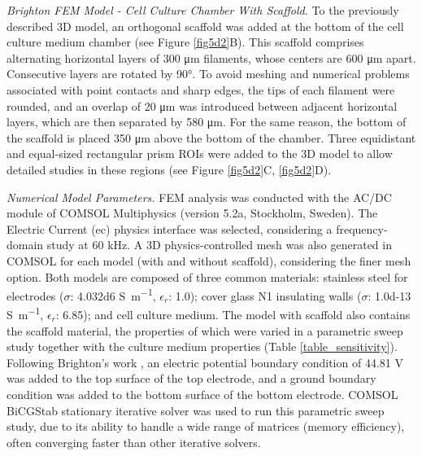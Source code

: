 \noindent \textit{Brighton \acs{FEM} Model - Cell Culture Chamber With Scaffold.} To the previously described \acs{3D} model, an orthogonal scaffold was added at the bottom of the cell culture medium chamber (see Figure \ref{fig5d2}B). This scaffold comprises alternating horizontal layers of 300 \si{\micro\meter} filaments, whose centers are 600 \si{\micro\meter} apart. Consecutive layers are rotated by 90\si{\degree}. To avoid meshing and numerical problems associated with point contacts and sharp edges, the tips of each filament were rounded, and an overlap of 20 \si{\micro\meter} was introduced between adjacent horizontal layers, which are then separated by 580 \si{\micro\meter}. For the same reason, the bottom of the scaffold is placed 350 \si{\micro\meter}  above the bottom of the chamber. Three equidistant and equal-sized rectangular prism \acs{ROI}s were added to the 3D model to allow detailed studies in these regions (see Figure \ref{fig5d2}C, \ref{fig5d2}D). \hfill \break

\noindent \textit{Numerical Model Parameters.} \acs{FEM} analysis was conducted with the AC/DC module of COMSOL Multiphysics (version 5.2a, Stockholm, Sweden). The Electric Current (ec) physics interface was selected, considering a frequency-domain study at 60 \si{\kilo\hertz}. A \acs{3D} physics-controlled mesh was also generated in COMSOL for each model (with and without scaffold), considering the finer mesh option. Both models are composed of three common materials: stainless steel for electrodes ($\sigma$: \num{4.032d6} \si{\siemens\per\meter}, $\epsilon_r$: 1.0); cover glass N1 insulating walls ($\sigma$: \num{1.0d-13} \si{\siemens\per\meter}, $\epsilon_r$: 6.85); and cell culture medium. The model with scaffold also contains the scaffold material, the properties of which were varied in a parametric sweep study together with the culture medium properties (Table \ref{table_sensitivity}). Following Brighton's work \cite{Brighton1988-vc, Brighton1992-gg}, an electric potential boundary condition of 44.81 \si{\volt} was added to the top surface of the top electrode, and a ground boundary condition was added to the bottom surface of the bottom electrode. COMSOL \acs{BiCGStab} stationary iterative solver was used to run this parametric sweep study, due to its ability to handle a wide range of matrices (memory efficiency), often converging faster than other iterative solvers. \hfill \break



